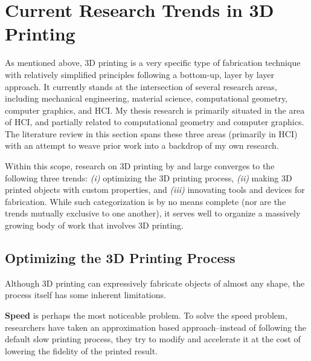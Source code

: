 \section{Current Research Trends in 3D Printing}
As mentioned above, 3D printing is a very specific type of fabrication technique with relatively simplified principles following a bottom-up, layer by layer approach. It currently stands at the intersection of several research areas, including mechanical engineering, material science, computational geometry, computer graphics, and HCI. My thesis research is primarily situated in the area of HCI, and partially related to computational geometry and computer graphics. The literature review in this section spans these three areas (primarily in HCI) with an attempt to weave prior work into a backdrop of my own research.

Within this scope, research on 3D printing by and large converges to the following three trends: {\em (i)} optimizing the 3D printing process, {\em (ii)} making 3D printed objects with custom properties, and {\em (iii)} innovating tools and devices for fabrication. While such categorization is by no means complete (nor are the trends mutually exclusive to one another), it serves well to organize a massively growing body of work that involves 3D printing.


\subsection{Optimizing the 3D Printing Process}
Although 3D printing can expressively fabricate objects of almost any shape, the process itself has some inherent limitations. 

\textbf{Speed} is perhaps the most noticeable problem. %
To solve the speed problem, researchers have taken an approximation based approach--instead of following the default slow printing process, they try to modify and accelerate it at the cost of lowering the fidelity of the printed result. 

